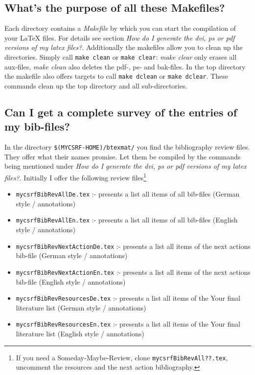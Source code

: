 \documentclass[DIV=calc,BCOR=5mm,11pt,headings=small,oneside,abstract=true, toc=bib]{scrartcl}
\begin{document}
\subsection{What's the purpose of all these Makefiles?}
Each directory contains a \textit{Makefile} by which you can start the
compilation of your LaTeX files. For details see section \textit{How do I
generate the dvi, ps or pdf versions of my latex files?}. Additionally the
makefiles allow you to clean up the directories. Simply call \texttt{make clean}
or \texttt{make clear}: \textit{make clear} only erases all aux-files,
\textit{make clean} also deletes the pdf-, ps- and bak-files. In the top
directory the makefile also offers targets to call \texttt{make
dclean} or \texttt{make dclear}. These commands clean up the top directory and
all sub-directories.

\subsection{Can I get a complete survey of the entries of my bib-files?}
In the directory \texttt{\$(MYCSRF-HOME)/btexmat/} you find the bibliography
review files. They offer what their names promise. Let them be compiled by the
commands being mentioned under \textit{How do I generate the dvi, ps or pdf
versions of my latex files?}. Initially I offer the following review
files\footnote{If you need a Someday-Maybe-Review, clone
\texttt{mycsrfBibRevAll??.tex}, uncomment the resources and the next action
bibliography.}

\begin{itemize}
  \item \texttt{mycsrfBibRevAllDe.tex} :- presents a list all items of all
  bib-files (German style / annotations)
  \item \texttt{mycsrfBibRevAllEn.tex} :- presents a list all items of all
  bib-files (English style / annotations)
  \item \texttt{mycsrfBibRevNextActionDe.tex} :- presents a list all items of
  the next actions bib-file (German style / annotations)
  \item \texttt{mycsrfBibRevNextActionEn.tex} :- presents a list all items of
  the next actions bib-file (English style / annotations)
  \item \texttt{mycsrfBibRevResourcesDe.tex} :- presents a list all items of
  the Your final literature list (German style / annotations)
  \item \texttt{mycsrfBibRevResourcesEn.tex} :- presents a list all items of
  the Your final literature list (English style / annotations)
\end{itemize}
\end{document}

